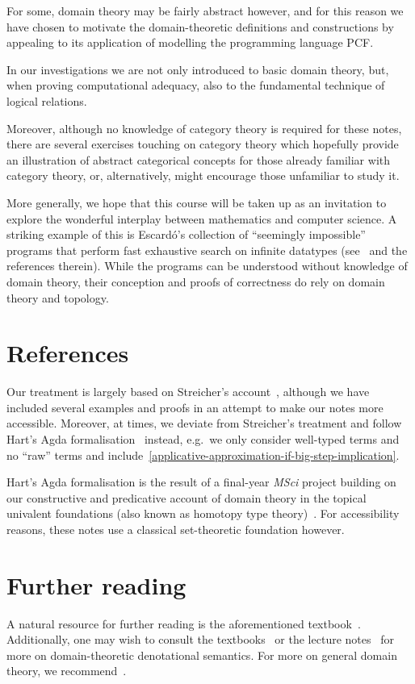 For some, domain theory may be fairly abstract however, and for this reason we
have chosen to motivate the domain-theoretic definitions and constructions by
appealing to its application of modelling the programming language PCF.

In our investigations we are not only introduced to basic domain theory, but,
when proving computational adequacy, also to the fundamental technique of
logical relations.

Moreover, although no knowledge of category theory is required for these notes,
there are several exercises touching on category theory which hopefully provide
an illustration of abstract categorical concepts for those already familiar with
category theory, or, alternatively, might encourage those unfamiliar to study it.

More generally, we hope that this course will be taken up as an invitation to
explore the wonderful interplay between mathematics and computer science.
%
A striking example of this is Escard\'o's collection of ``seemingly impossible''
programs that perform fast exhaustive search on infinite datatypes
(see~\cite{Escardo2007b} and the references therein).
%
While the programs can be understood without knowledge of domain theory, their
conception and proofs of correctness do rely on domain theory and topology.

\section{References}

Our treatment is largely based on Streicher's account~\cite{Streicher2006},
although we have included several examples and proofs in an attempt to make our
notes more accessible.
%
Moreover, at times, we deviate from Streicher's treatment and follow Hart's Agda
formalisation~\cite{Hart2020} instead, e.g.\ we only consider well-typed terms
and no ``raw'' terms and
include~\cref{applicative-approximation-if-big-step-implication}.

Hart's Agda formalisation is the result of a final-year \emph{MSci} project
building on our constructive and predicative account of domain theory in the
topical univalent foundations (also known as homotopy type
theory)~\cite{deJong2022}. For accessibility reasons, these notes use a
classical set-theoretic foundation however.

\section{Further reading}

A natural resource for further reading is the aforementioned
textbook~\cite{Streicher2006}.
%
Additionally, one may wish to consult the
textbooks~\cite{Winskel1993,Gunther1992} or the lecture
notes~\cite{Plotkin1983,PittsWinskelFiore2012} for more on domain-theoretic denotational
semantics.
%
For more on general domain theory, we
recommend~\cite{AbramskyJung1994,GierzEtAl2003}.


